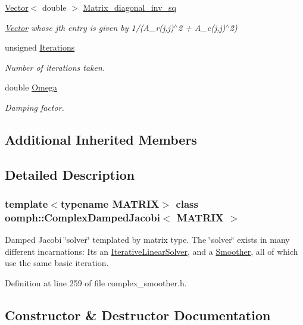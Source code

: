\begin{DoxyCompactItemize}
\hyperlink{classoomph_1_1Vector}{Vector}$<$ double $>$ \hyperlink{classoomph_1_1ComplexDampedJacobi_a5626c629f590cee327c045a333ca315d}{Matrix\+\_\+diagonal\+\_\+inv\+\_\+sq}
\begin{DoxyCompactList}\small\item\em \hyperlink{classoomph_1_1Vector}{Vector} whose j\textquotesingle{}th entry is given by 1/(A\+\_\+r(j,j)$^\wedge$2 + A\+\_\+c(j,j)$^\wedge$2) \end{DoxyCompactList}\item 
unsigned \hyperlink{classoomph_1_1ComplexDampedJacobi_af6c791c81e9600c9c4daa13ae3024dec}{Iterations}
\begin{DoxyCompactList}\small\item\em Number of iterations taken. \end{DoxyCompactList}\item 
double \hyperlink{classoomph_1_1ComplexDampedJacobi_a735337bf7a2a9d3f2265d8c5eaf74850}{Omega}
\begin{DoxyCompactList}\small\item\em Damping factor. \end{DoxyCompactList}\end{DoxyCompactItemize}
\subsection*{Additional Inherited Members}


\subsection{Detailed Description}
\subsubsection*{template$<$typename M\+A\+T\+R\+IX$>$\newline
class oomph\+::\+Complex\+Damped\+Jacobi$<$ M\+A\+T\+R\+I\+X $>$}

Damped Jacobi \char`\"{}solver\char`\"{} templated by matrix type. The \char`\"{}solver\char`\"{} exists in many different incarnations\+: It\textquotesingle{}s an \hyperlink{classoomph_1_1IterativeLinearSolver}{Iterative\+Linear\+Solver}, and a \hyperlink{classoomph_1_1Smoother}{Smoother}, all of which use the same basic iteration. 

Definition at line 259 of file complex\+\_\+smoother.\+h.



\subsection{Constructor \& Destructor Documentation}
\mbox{\label{classoomph_1_1ComplexDampedJacobi_a5c76dd5e5fac0246eced85a66df6c7ee}} 
